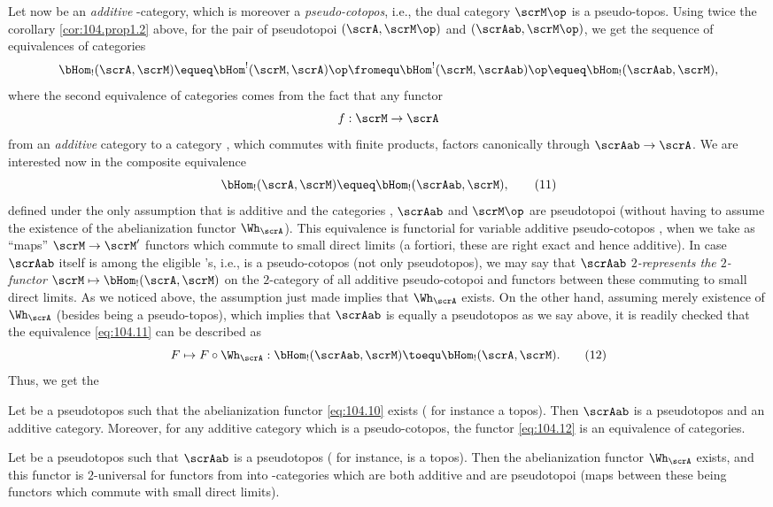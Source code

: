 Let now \scrM{} be an \emph{additive} \scrU-category, which is
moreover a \emph{pseudo-cotopos}, i.e., the dual category $\scrM\op$
is a pseudo-topos. Using twice the corollary \ref{cor:104.prop1.2} above,
for the pair of pseudotopoi $(\scrA,\scrM\op)$ and
$(\scrAab,\scrM\op)$, we get the sequence of equivalences of
categories
\[\bHom_!(\scrA,\scrM)\equeq\bHom^!(\scrM,\scrA)\op \fromequ
\bHom^!(\scrM,\scrAab)\op \equeq \bHom_!(\scrAab,\scrM),\]
where the second equivalence of categories comes from the fact that
any functor
\[f:\scrM\to\scrA\]
from an \emph{additive} category \scrM{} to a category \scrA, which
commutes with finite products, factors canonically through
$\scrAab\to\scrA$. We are interested now in the composite
equivalence
\begin{equation}
  \label{eq:104.11}
  \bHom_!(\scrA,\scrM)\equeq\bHom_!(\scrAab,\scrM),\tag{11}
\end{equation}
defined under the only assumption that \scrM{} is additive and the
categories \scrA, $\scrAab$ and $\scrM\op$ are pseudotopoi
(without having to assume the existence of the abelianization functor
$\Wh_\scrA$). This equivalence is functorial for variable additive
pseudo-cotopos \scrM, when we take as ``maps'' $\scrM\to\scrM'$
functors which commute to small direct limits (a fortiori, these are
right exact and hence additive). In case $\scrAab$ itself is among
the eligible \scrM's, i.e., is a pseudo-cotopos (not only
pseudotopos), we may say that \emph{$\scrAab$ $2$-represents the
  $2$-functor $\scrM\mapsto\bHom_!(\scrA,\scrM)$} on the $2$-category
of all additive pseudo-cotopoi and functors between these commuting to
small direct limits. As we noticed above, the assumption just made
implies that $\Wh_\scrA$ exists. On the other hand, assuming merely
existence of $\Wh_\scrA$ (besides \scrA{} being a pseudo-topos), which
implies that $\scrAab$ is equally a pseudotopos as we say above,
it is readily checked that the equivalence \eqref{eq:104.11} can be
described as
\begin{equation}
  \label{eq:104.12}
  F\mapsto F\circ\Wh_\scrA : \bHom_!(\scrAab,\scrM) \toequ
  \bHom_!(\scrA,\scrM).\tag{12} 
\end{equation}
Thus, we get the
\begin{propositionnum}\label{prop:104.2}
  Let \scrA{} be a pseudotopos such that the abelianization functor
  \eqref{eq:104.10} exists \textup(\kern2pt for instance \scrA{} a
  topos\textup). Then $\scrAab$ is a pseudotopos and an additive
  category. Moreover, for any additive category \scrM{} which is a
  pseudo-cotopos, the functor \eqref{eq:104.12} is an equivalence of
  categories. 
\end{propositionnum}
\setcounter{corollarynum}{0}
\begin{corollarynum}\label{cor:104.prop2.1}
  Let \scrA{} be a pseudotopos such that $\scrAab$ is
  a pseudotopos \textup(\kern2pt for instance, \scrA{} is a
  topos\textup). Then the abelianization functor $\Wh_\scrA$ exists,
  and this functor is $2$-universal for functors from \scrA{} into
  \scrU-categories which are both additive and are pseudotopoi
  \textup(maps between these being functors which commute with small
  direct limits\textup).
\end{corollarynum}

